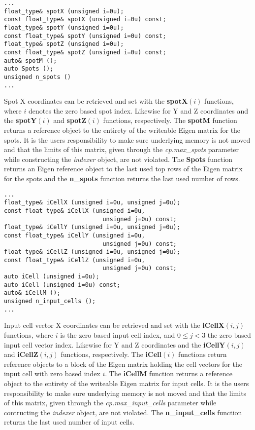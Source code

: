 \documentclass[a4paper,10pt]{article}
\begin{document}
%
\begin{lstlisting}
...
float_type& spotX (unsigned i=0u);
const float_type& spotX (unsigned i=0u) const;
float_type& spotY (unsigned i=0u);
const float_type& spotY (unsigned i=0u) const;
float_type& spotZ (unsigned i=0u);
const float_type& spotZ (unsigned i=0u) const;
auto& spotM ();
auto Spots ();
unsigned n_spots ()
...
\end{lstlisting}
%
Spot X coordinates can be retrieved and set with the \textbf{spotX}$(i)$ functions, where $i$ denotes the zero based spot index. Likewise for Y and Z coordinates and the \textbf{spotY}$(i)$ and \textbf{spotZ}$(i)$ functions, respectively. The \textbf{spotM} function returns a reference object to the entirety of the writeable Eigen matrix for the spots. It is the users responsibility to make sure underlying memory is not moved and that the limits of this matrix, given through the \emph{cp.max\_spots} parameter while constructing the \emph{indexer} object, are not violated. The \textbf{Spots} function returns an Eigen reference object to the last used top rows of the Eigen matrix for the spots and the \textbf{n\_spots} function returns the last used number of rows.
%
\begin{lstlisting}
...
float_type& iCellX (unsigned i=0u, unsigned j=0u);
const float_type& iCellX (unsigned i=0u,
                            unsigned j=0u) const;
float_type& iCellY (unsigned i=0u, unsigned j=0u);
const float_type& iCellY (unsigned i=0u,
                            unsigned j=0u) const;
float_type& iCellZ (unsigned i=0u, unsigned j=0u);
const float_type& iCellZ (unsigned i=0u,
                            unsigned j=0u) const;
auto iCell (unsigned i=0u);
auto iCell (unsigned i=0u) const;
auto& iCellM ();
unsigned n_input_cells ();
...
\end{lstlisting}
%
Input cell vector X coordinates can be retrieved and set with the \textbf{iCellX}$(i,j)$ functions, where $i$ is the zero based input cell index, and $0\leq j<3$ the zero based input cell vector index. Likewise for Y and Z coordinates and the \textbf{iCellY}$(i,j)$ and \textbf{iCellZ}$(i,j)$ functions, respectively. The \textbf{iCell}$(i)$ functions return reference objects to a block of the Eigen matrix holding the cell vectors for the input cell with zero based index $i$. The \textbf{iCellM} function returns a reference object to the entirety of the writeable Eigen matrix for input cells. It is the users responsibility to make sure underlying memory is not moved and that the limits of this matrix, given through the \emph{cp.max\_input\_cells} parameter while contructing the \emph{indexer} object, are not violated. The \textbf{n\_input\_cells} function returns the last used number of input cells.
\end{document}

